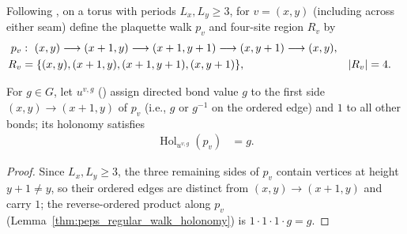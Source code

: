 \begin{definition}%
    \label{def:peps_torus_plaquette_flux_geometry}
    \leanok
    Following \cite[proof of Theorem~6.15]{Schuch2010PEPS}, on a torus with periods $L_x,L_y\ge3$, for $v=(x,y)$ (including across either seam) define the plaquette walk $p_v$ and four-site region $R_v$ by
    \begin{align}
        p_v & :\ (x,y)\longrightarrow(x+1,y)
        \longrightarrow(x+1,y+1)\longrightarrow(x,y+1)
        \longrightarrow(x,y), \notag                              \\
        R_v & =\{(x,y),(x+1,y),(x+1,y+1),(x,y+1)\}, & |R_v| & =4.
        \label{eq:peps_plaquette_flux_walk}
    \end{align}
\end{definition}

\begin{definition}%
    \label{def:peps_torus_plaquette_flux_insertion}
    \leanok
    For $g\in G$, let $u^{v,g}$ (\cite[Section~6.5 and proof of Theorem~6.15]{Schuch2010PEPS}) assign directed bond value $g$ to the first side $(x,y)\to(x+1,y)$ of $p_v$ (i.e., $g$ or $g^{-1}$ on the ordered edge) and $1$ to all other bonds; its holonomy satisfies
    \begin{align}
        \operatorname{Hol}_{u^{v,g}}(p_v) & =g.
        \label{eq:peps_plaquette_flux_holonomy}
    \end{align}
\end{definition}
\begin{proof}\leanok
    Since $L_x,L_y\ge3$, the three remaining sides of $p_v$ contain vertices at height $y+1\neq y$, so their ordered edges are distinct from $(x,y)\to(x+1,y)$ and carry $1$; the reverse-ordered product along $p_v$ (Lemma~\ref{thm:peps_regular_walk_holonomy}) is $1\cdot1\cdot1\cdot g=g$.
\end{proof}

